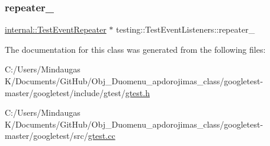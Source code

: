 \subsubsection{\texorpdfstring{repeater\_}{repeater\_}}
{\footnotesize\ttfamily \mbox{\hyperlink{classtesting_1_1internal_1_1_test_event_repeater}{internal\+::\+Test\+Event\+Repeater}} $\ast$ testing\+::\+Test\+Event\+Listeners\+::repeater\+\_\+\hspace{0.3cm}{\ttfamily [private]}}



The documentation for this class was generated from the following files\+:\begin{DoxyCompactItemize}
\item 
C\+:/\+Users/\+Mindaugas K/\+Documents/\+Git\+Hub/\+Obj\+\_\+\+Duomenu\+\_\+apdorojimas\+\_\+class/googletest-\/master/googletest/include/gtest/\mbox{\hyperlink{googletest-master_2googletest_2include_2gtest_2gtest_8h}{gtest.\+h}}\item 
C\+:/\+Users/\+Mindaugas K/\+Documents/\+Git\+Hub/\+Obj\+\_\+\+Duomenu\+\_\+apdorojimas\+\_\+class/googletest-\/master/googletest/src/\mbox{\hyperlink{googletest-master_2googletest_2src_2gtest_8cc}{gtest.\+cc}}\end{DoxyCompactItemize}
